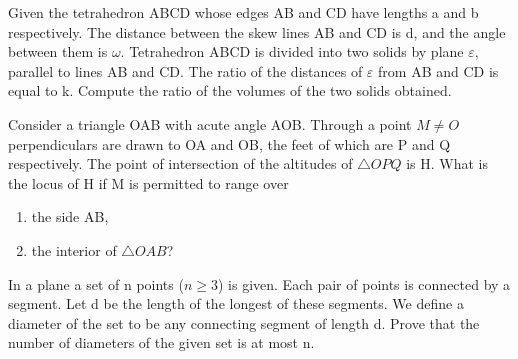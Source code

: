 \item Given the tetrahedron ABCD whose edges AB and CD have lengths a and b respectively. The distance between the skew lines AB and CD is d, and the angle between them is $\omega$. Tetrahedron ABCD is divided into two solids by plane $\varepsilon$, parallel to lines AB and CD. The ratio of the distances of $\varepsilon$ from AB and CD is equal to k. Compute the ratio of the volumes of the two solids obtained.
\item Consider a triangle OAB with acute angle AOB. Through a point $M \neq O$ perpendiculars are drawn to OA and OB, the feet of which are P and Q respectively. The point of intersection of the altitudes of $\triangle{OPQ}$ is H. What is the locus of H if M is permitted to range over
\begin{enumerate}
\item the side AB, 
\item  the interior of $\triangle{OAB}$?
\end{enumerate}
\item In a plane a set of n points ($n \geq 3$) is given. Each pair of points is connected by a segment. Let d be the length of the longest of these segments. We define a diameter of the set to be any connecting segment of length d. Prove that the number of diameters of the given set is at most n.



